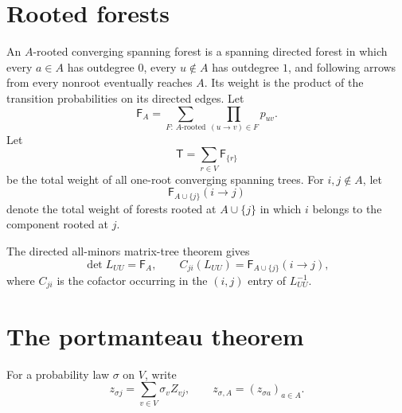 \documentclass[11pt]{article}
\newcommand{\cF}{\mathsf F}
\newcommand{\cT}{\mathsf T}
\begin{document}
\section{Rooted forests}
An $A$-rooted converging spanning forest is a spanning directed forest in which every $a\in A$ has outdegree $0$, every $u\notin A$ has outdegree $1$, and following arrows from every nonroot eventually reaches $A$.  Its weight is the product of the transition probabilities on its directed edges.  Let
\[
\cF_A=\sum_{F:\,A\text{-rooted}}\prod_{(u\to v)\in F}p_{uv}.
\]
Let
\[
\cT=\sum_{r\in V}\cF_{\{r\}}
\]
be the total weight of all one-root converging spanning trees.  For $i,j\notin A$, let
\[
\cF_{A\cup\{j\}}(i\to j)
\]
denote the total weight of forests rooted at $A\cup\{j\}$ in which $i$ belongs to the component rooted at $j$.

The directed all-minors matrix-tree theorem gives
\begin{equation}
\det L_{UU}=\cF_A,
\qquad
C_{ji}(L_{UU})=\cF_{A\cup\{j\}}(i\to j),
\tag{2.1}
\end{equation}
where $C_{ji}$ is the cofactor occurring in the $(i,j)$ entry of $L_{UU}^{-1}$.

\section{The portmanteau theorem}
For a probability law $\sigma$ on $V$, write
\[
z_{\sigma j}=\sum_{v\in V}\sigma_v Z_{vj},
\qquad
z_{\sigma,A}=(z_{\sigma a})_{a\in A}.
\]
\end{document}
